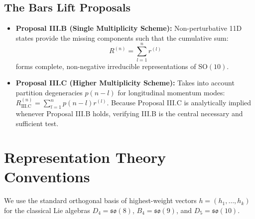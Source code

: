 \documentclass[11pt,a4paper]{article}
\begin{document}
\subsection{The Bars Lift Proposals}
\begin{itemize}
    \item \textbf{Proposal III.B (Single Multiplicity Scheme):} Non-perturbative 11D states provide the missing components such that the cumulative sum:
    \begin{equation}
        R^{(n)} = \sum_{l=1}^n r^{(l)}
    \end{equation}
    forms complete, non-negative irreducible representations of $\mathrm{SO}(10)$.
    \item \textbf{Proposal III.C (Higher Multiplicity Scheme):} Takes into account partition degeneracies $p(n-l)$ for longitudinal momentum modes: $R_{\text{III.C}}^{(n)} = \sum_{l=1}^n p(n-l) r^{(l)}$. Because Proposal III.C is analytically implied whenever Proposal III.B holds, verifying III.B is the central necessary and sufficient test.
\end{itemize}

\section{Representation Theory Conventions}
\label{sec:rep_theory}
We use the standard orthogonal basis of highest-weight vectors $h = (h_1, \dots, h_k)$ for the classical Lie algebras $D_4 = \mathfrak{so}(8)$, $B_4 = \mathfrak{so}(9)$, and $D_5 = \mathfrak{so}(10)$.
\end{document}
